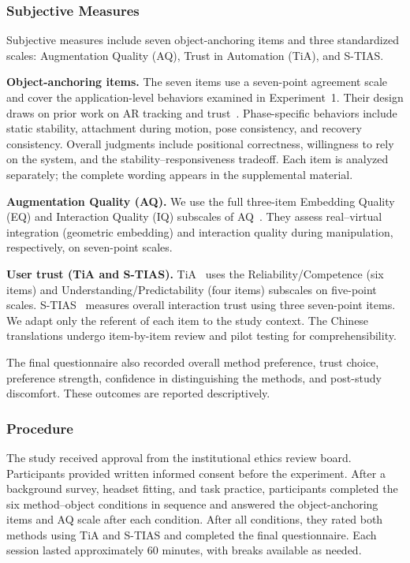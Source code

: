 \documentclass[review]{vgtc}
\begin{document}
\subsubsection{Subjective Measures}

Subjective measures include seven object-anchoring items and three standardized scales: Augmentation Quality (AQ), Trust in Automation (TiA), and S-TIAS.

\textbf{Object-anchoring items.}
The seven items use a seven-point agreement scale and cover the application-level behaviors examined in Experiment~1. Their design draws on prior work on AR tracking and trust~\cite{trustar2024}. Phase-specific behaviors include static stability, attachment during motion, pose consistency, and recovery consistency. Overall judgments include positional correctness, willingness to rely on the system, and the stability--responsiveness tradeoff. Each item is analyzed separately; the complete wording appears in the supplemental material.

\textbf{Augmentation Quality (AQ).}
We use the full three-item Embedding Quality (EQ) and Interaction Quality (IQ) subscales of AQ~\cite{aq2026}. They assess real--virtual integration (geometric embedding) and interaction quality during manipulation, respectively, on seven-point scales.

\textbf{User trust (TiA and S-TIAS).}
TiA~\cite{tia2019} uses the Reliability/Competence (six items) and Understanding/Predictability (four items) subscales on five-point scales. S-TIAS~\cite{stias2025} measures overall interaction trust using three seven-point items. We adapt only the referent of each item to the study context. The Chinese translations undergo item-by-item review and pilot testing for comprehensibility.

The final questionnaire also recorded overall method preference, trust choice, preference strength, confidence in distinguishing the methods, and post-study discomfort. These outcomes are reported descriptively.

\subsubsection{Procedure}

The study received approval from the institutional ethics review board. Participants provided written informed consent before the experiment. After a background survey, headset fitting, and task practice, participants completed the six method--object conditions in sequence and answered the object-anchoring items and AQ scale after each condition. After all conditions, they rated both methods using TiA and S-TIAS and completed the final questionnaire. Each session lasted approximately 60 minutes, with breaks available as needed.
\end{document}
